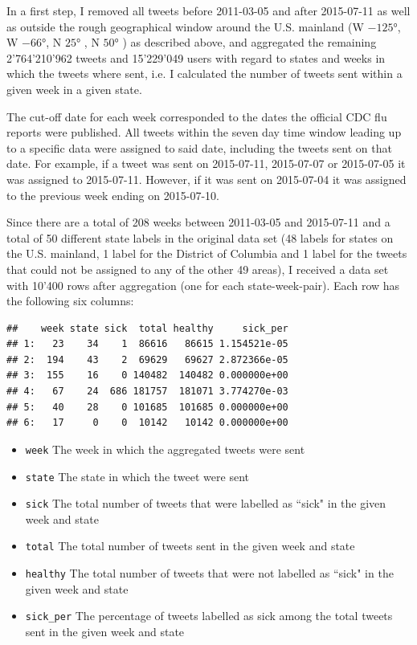 \documentclass[11pt, a4paper,twoside]{report}\usepackage[]{graphicx}\usepackage[]{color}
\makeatletter
\newenvironment{kframe}{%
 \def\at@end@of@kframe{}%
 \ifinner\ifhmode%
  \def\at@end@of@kframe{\end{minipage}}%
  \begin{minipage}{\columnwidth}%
 \fi\fi%
 \def\FrameCommand##1{\hskip\@totalleftmargin \hskip-\fboxsep
 \colorbox{shadecolor}{##1}\hskip-\fboxsep
     \hskip-\linewidth \hskip-\@totalleftmargin \hskip\columnwidth}%
 \MakeFramed {\advance\hsize-\width
   \@totalleftmargin\z@ \linewidth\hsize
   \@setminipage}}%
 {\par\unskip\endMakeFramed%
 \at@end@of@kframe}
\newenvironment{knitrout}{}{} %
\makeatother
\begin{document}
In a first step, I removed all tweets before 2011-03-05 and after 2015-07-11 as well as outside the rough geographical window around the U.S. mainland (W $-125$°, W $-66$°, N $25$° , N $50$° ) as described above, and aggregated the remaining 2'764'210'962 tweets and 15'229'049 users with regard to states and weeks in which the tweets where sent, i.e. I calculated the number of tweets sent within a given week in a given state.

The cut-off date for each week corresponded to the dates the official CDC flu reports were published. All tweets within the seven day time window leading up to a specific data were assigned to said date, including the tweets sent on that date. For example, if a tweet was sent on 2015-07-11, 2015-07-07 or 2015-07-05 it was assigned to 2015-07-11. However, if it was sent on 2015-07-04 it was assigned to the previous week ending on 2015-07-10.

Since there are a total of 208 weeks between 2011-03-05 and 2015-07-11 and a total of 50 different state labels in the original data set (48 labels for states on the U.S. mainland, 1 label for the District of Columbia and 1 label for the tweets that could not be assigned to any of the other 49 areas), I received a data set with 10'400 rows after aggregation (one for each state-week-pair). Each row has the following six columns:

\begin{knitrout}
\color{fgcolor}\begin{kframe}
\begin{verbatim}
##    week state sick  total healthy     sick_per
## 1:   23    34    1  86616   86615 1.154521e-05
## 2:  194    43    2  69629   69627 2.872366e-05
## 3:  155    16    0 140482  140482 0.000000e+00
## 4:   67    24  686 181757  181071 3.774270e-03
## 5:   40    28    0 101685  101685 0.000000e+00
## 6:   17     0    0  10142   10142 0.000000e+00
\end{verbatim}
\end{kframe}
\end{knitrout}

\begin{itemize}
  \item \texttt{week} The week in which the aggregated tweets were sent
  \item \texttt{state} The state in which the tweet were sent
  \item \texttt{sick} The total number of tweets that were labelled as ``sick" in the given week and state
  \item \texttt{total} The total number of tweets sent in the given week and state
  \item \texttt{healthy} The total number of tweets that were not labelled as ``sick" in the given week and state
  \item \texttt{sick\_per} The percentage of tweets labelled as sick among the total tweets sent in the given week and state
\end{itemize}
\end{document}
